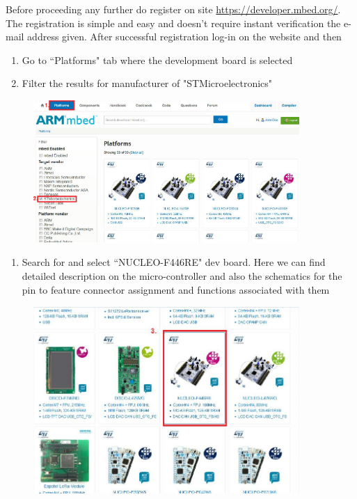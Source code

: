 \documentclass[a4paper]{article}
\begin{document}
Before proceeding any further do register on site \url{https://developer.mbed.org/}. The registration is simple and easy
and doesn't require instant verification the e-mail address given. After successful registration log-in on the website
and then
\begin{enumerate}
    \item Go to ``Platforms" tab where the development board is selected
    \item Filter the results for manufacturer of "STMicroelectronics"
\end{enumerate}
\begin{figure}[H]
    \centering
    \includegraphics[width=0.9\textwidth]{figures/mbed-platform.png}
\end{figure}
\begin{enumerate}[resume]
    \item Search for and select ``NUCLEO-F446RE" dev board. Here we can find detailed description on the micro-controller
          and also the schematics for the pin to feature connector assignment and functions associated with them
\end{enumerate}
\begin{figure}[H]
    \centering
    \includegraphics[width=0.9\textwidth]{figures/mbed-nucleo.png}
\end{figure}
\end{document}
